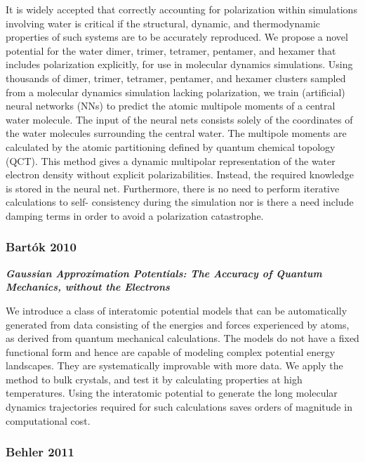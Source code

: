\documentclass[11pt]{article}
\begin{document}
It is widely accepted that correctly accounting for polarization within
simulations involving water is critical if the structural, dynamic, and
thermodynamic properties of such systems are to be accurately
reproduced. We propose a novel potential for the water dimer, trimer,
tetramer, pentamer, and hexamer that includes polarization explicitly,
for use in molecular dynamics simulations. Using thousands of dimer,
trimer, tetramer, pentamer, and hexamer clusters sampled from a
molecular dynamics simulation lacking polarization, we train
(artificial) neural networks (NNs) to predict the atomic multipole
moments of a central water molecule. The input of the neural nets
consists solely of the coordinates of the water molecules surrounding
the central water. The multipole moments are calculated by the atomic
partitioning defined by quantum chemical topology (QCT). This method
gives a dynamic multipolar representation of the water electron density
without explicit polarizabilities. Instead, the required knowledge is
stored in the neural net. Furthermore, there is no need to perform
iterative calculations to self- consistency during the simulation nor is
there a need include damping terms in order to avoid a polarization
catastrophe.

    \subsubsection{Bartók 2010}\label{bartuxf3k-2010}

\textbf{\emph{Gaussian Approximation Potentials: The Accuracy of Quantum
Mechanics, without the Electrons}}

We introduce a class of interatomic potential models that can be
automatically generated from data consisting of the energies and forces
experienced by atoms, as derived from quantum mechanical calculations.
The models do not have a fixed functional form and hence are capable of
modeling complex potential energy landscapes. They are systematically
improvable with more data. We apply the method to bulk crystals, and
test it by calculating properties at high temperatures. Using the
interatomic potential to generate the long molecular dynamics
trajectories required for such calculations saves orders of magnitude in
computational cost.

    \subsubsection{Behler 2011}\label{behler-2011}
\end{document}

